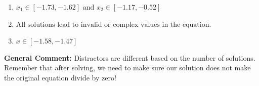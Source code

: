 \documentclass{extbook}[14pt]
\begin{document}
\begin{enumerate}
{\begin{enumerate}[label=\Alph*.]
\item \( x_1 \in [-1.73, -1.62] \text{ and } x_2 \in [-1.17,-0.52] \)


\item \( \text{All solutions lead to invalid or complex values in the equation.} \)


\item \( x \in [-1.58,-1.47] \)


\end{enumerate}

\textbf{General Comment:} Distractors are different based on the number of solutions. Remember that after solving, we need to make sure our solution does not make the original equation divide by zero!
}
\end{enumerate}
\end{document}
